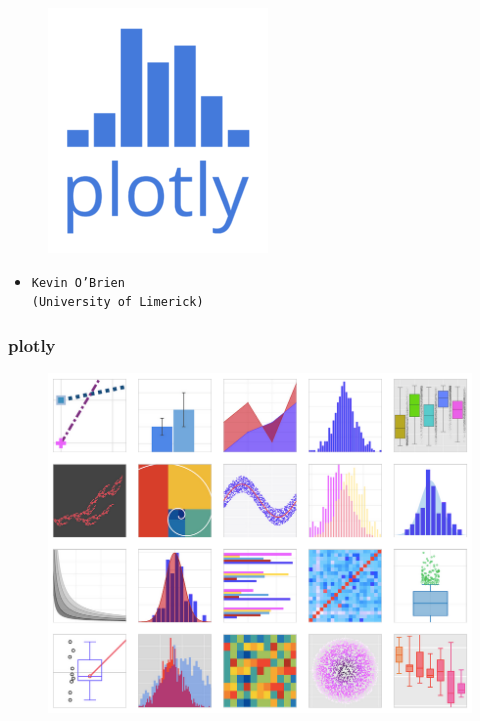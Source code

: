 \documentclass{beamer}
\begin{document}
	\begin{frame}
		\vspace{-0.5cm}
\begin{figure}
\centering
\includegraphics[width=0.55\linewidth]{plotlylogo}
\end{figure}

	\Large
\begin{itemize}
	\item \texttt{Kevin O'Brien} 
 \\ {\Large \texttt{(University of Limerick)}}
\end{itemize}	
	
\end{frame}
\begin{frame}
	\frametitle{plotly}
	\large		
	\begin{figure}
		\centering
		\includegraphics[width=0.8\linewidth]{plotlygallery}
	\end{figure}
	
\end{frame}
\end{document}
